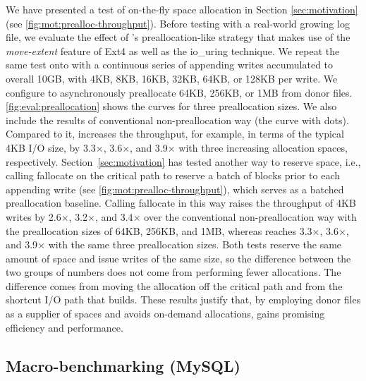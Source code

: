 We have presented a test of on-the-fly space allocation in Section \ref{sec:motivation}  (see \autoref{fig:mot:prealloc-throughput}).
Before testing with a real-world   growing log file, we evaluate the effect of \odes's preallocation-like strategy that makes use of the {\em move-extent} feature of Ext4 as well as the io\_uring technique.
We repeat the same test onto \odes with a continuous  series of appending writes accumulated to overall 10GB, with 4KB, 8KB, 16KB, 32KB, 64KB, or 128KB
per write. We configure \odes to 
asynchronously preallocate 64KB, 256KB, or 1MB from donor files.
\autoref{fig:eval:preallocation} shows the curves for three  preallocation sizes. We also include the results of conventional non-preallocation way
(the curve with dots). %
Compared to it,
\odes increases  the throughput, for example, in terms of the typical 4KB I/O size,  by 3.3$\times$, 3.6$\times$, and 3.9$\times$ 
with three  increasing allocation spaces, respectively.
Section~\ref{sec:motivation} has tested another way to reserve space, i.e.,
calling fallocate on the critical path to reserve a batch of blocks prior to each
appending write (see \autoref{fig:mot:prealloc-throughput}), which serves as a
batched preallocation baseline. Calling fallocate in this way raises the throughput
of 4KB writes by 2.6$\times$, 3.2$\times$, and 3.4$\times$ over the conventional
non-preallocation way with the preallocation sizes of 64KB, 256KB, and 1MB, whereas
\odes reaches 3.3$\times$, 3.6$\times$, and 3.9$\times$ with the same three
preallocation sizes.
Both tests reserve the same amount of space and issue writes of the same size, so
the difference between the two groups of numbers does not come from performing
fewer allocations. The difference comes from moving the allocation off the critical
path and from the shortcut I/O path that \odes builds.
These results justify that,
by employing donor files as a supplier of spaces and avoids on-demand allocations,
\odes
gains promising efficiency and  performance.
	
	


\subsection{Macro-benchmarking (MySQL)}\label{sec:eval:mysql}

